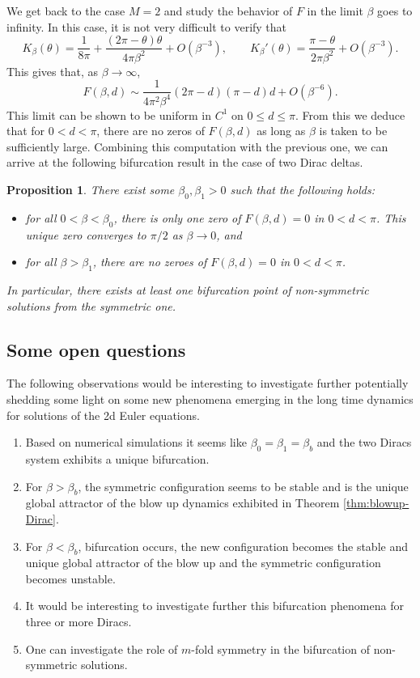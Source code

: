 \documentclass[JEP,XML,SOM,Unicode,NoFloatCountersInSection,published]{cedram}
\theoremstyle{plain}
\newtheorem{proposition}[theorem]{Proposition}
\theoremstyle{definition}
\let\bt\beta
\let\tht\theta
\begin{document}
We get back to the case $M=2$ and study the behavior of $F$ in the limit $\beta$ goes to infinity. In this case, it is not very difficult to verify that
\begin{equation*}
K_{\bt}(\tht) = \frac{1}{8\pi} + \frac{(2\pi-\tht)\tht}{4\pi \bt^2} + O(\bt^{-3}),\qquad K_{\bt}'(\tht) = \frac{\pi-\tht}{2\pi\bt^2} + O(\bt^{-3}).
\end{equation*}
This gives that, as $\bt\to\infty$,\vspace*{-3pt}
\begin{equation*}
F(\bt,d)\sim \frac{1}{4\pi^2 \bt^4} (2\pi-d)(\pi-d)d + O(\bt^{-6}).
\end{equation*}
This limit can be shown to be uniform in $C^1$ on $0\le d \le \pi$. From this we deduce that for $0<d<\pi$, there are no zeros of $F(\bt,d)$ as long as $\bt$ is taken to be sufficiently large. Combining this computation with the previous one, we can arrive at the following bifurcation result in the case of two Dirac deltas.
\begin{proposition}
There exist some $\bt_{0},\bt_{1}>0$ such that the following holds:
\begin{itemize}
\item for all $0<\bt<\bt_{0}$, there is only one zero of $F(\bt,d)=0$ in $0<d<\pi$. This unique zero converges to $\pi/2$ as $\bt\to0$, and
\item for all $\bt>\bt_{1}$, there are no zeroes of $F(\bt,d)=0$ in $0<d<\pi$.
\end{itemize} In particular, there exists at least one bifurcation point of non-symmetric solutions from the symmetric one.
\end{proposition}
\subsection{Some open questions}
The following observations would be interesting to investigate further potentially shedding some light on some new phenomena emerging in the long time dynamics for solutions of the 2d Euler equations.
\begin{enumerate}
\item Based on numerical simulations it seems like $\beta_0=\beta_1=\beta_b$ and the two Diracs system exhibits a unique bifurcation.
\item For $\beta> \beta_b$, the symmetric configuration seems to be stable and is the unique global attractor of the blow up dynamics exhibited in Theorem \ref{thm:blowup-Dirac}.
\item For $\beta< \beta_b$, bifurcation occurs, the new configuration becomes the stable and unique global attractor of the blow up and the symmetric configuration becomes unstable.
\item It would be interesting to investigate further this bifurcation phenomena for three or more Diracs.
\item One can investigate the role of $m$-fold symmetry in the bifurcation of non-symmetric solutions.
\end{enumerate}
\end{document}
